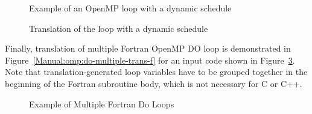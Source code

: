 \lstset{language=C,basicstyle=\scriptsize}
\begin{figure}[htbp]
{\indent
  {\mySmallFontSize
    \begin{latexonly}
    
    \end{latexonly}
    \begin{htmlonly}
    
    \end{htmlonly}
  }
}
\caption{Example of an OpenMP loop with a dynamic schedule}
\label{Manual:omp:ompfor4}
\end{figure}

\begin{figure}[htbp]
{\indent
  {\mySmallFontSize
    \begin{latexonly}
    
    \end{latexonly}
    \begin{htmlonly}
    
    \end{htmlonly}
  }
}
\caption{Translation of the loop with a dynamic schedule}
\label{Manual:omp:ompfor4-trans}
\end{figure}

\clearpage
Finally, translation of multiple Fortran OpenMP DO loop 
is demonstrated in
Figure~\ref{Manual:omp:do-multiple-trans-f} for an input code shown in
Figure~\ref{Manual:omp:do-multiple-f}. Note that translation-generated loop variables
have to be grouped together in the beginning of the Fortran subroutine body, which is not necessary for 
C or C++.

\lstset{language=Fortran,basicstyle=\scriptsize}
\lstset{language=Fortran,basicstyle=\scriptsize,numbers=left}
\begin{figure}[htbp]
{\indent
  {\mySmallFontSize
    \begin{latexonly}
    
    \end{latexonly}
    \begin{htmlonly}
    
    \end{htmlonly}
  }
}
\caption{Example of Multiple Fortran Do Loops}
\label{Manual:omp:do-multiple-f}
\end{figure}

